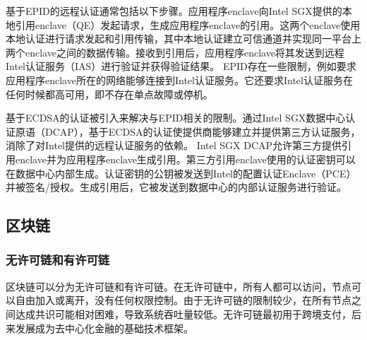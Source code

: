 基于EPID的远程认证通常包括以下步骤。应用程序enclave向Intel SGX提供的本地引用enclave（QE）发起请求，生成应用程序enclave的引用。这两个enclave使用本地认证进行请求发起和引用传输，其中本地认证建立可信通道并实现同一平台上两个enclave之间的数据传输。接收到引用后，应用程序enclave将其发送到远程Intel认证服务（IAS）进行验证并获得验证结果。
EPID存在一些限制，例如要求应用程序enclave所在的网络能够连接到Intel认证服务。它还要求Intel认证服务在任何时候都高可用，即不存在单点故障或停机。

基于ECDSA的认证被引入来解决与EPID相关的限制。通过Intel SGX数据中心认证原语（DCAP），基于ECDSA的认证使提供商能够建立并提供第三方认证服务，消除了对Intel提供的远程认证服务的依赖。
Intel SGX DCAP允许第三方提供引用enclave并为应用程序enclave生成引用。第三方引用enclave使用的认证密钥可以在数据中心内部生成。认证密钥的公钥被发送到Intel的配置认证Enclave（PCE）并被签名/授权。生成引用后，它被发送到数据中心的内部认证服务进行验证。


\subsection{区块链}
\subsubsection{无许可链和有许可链}
区块链可以分为无许可链和有许可链。在无许可链中，所有人都可以访问，节点可以自由加入或离开，没有任何权限控制。由于无许可链的限制较少，在所有节点之间达成共识可能相对困难，导致系统吞吐量较低。无许可链最初用于跨境支付，后来发展成为去中心化金融的基础技术框架。

